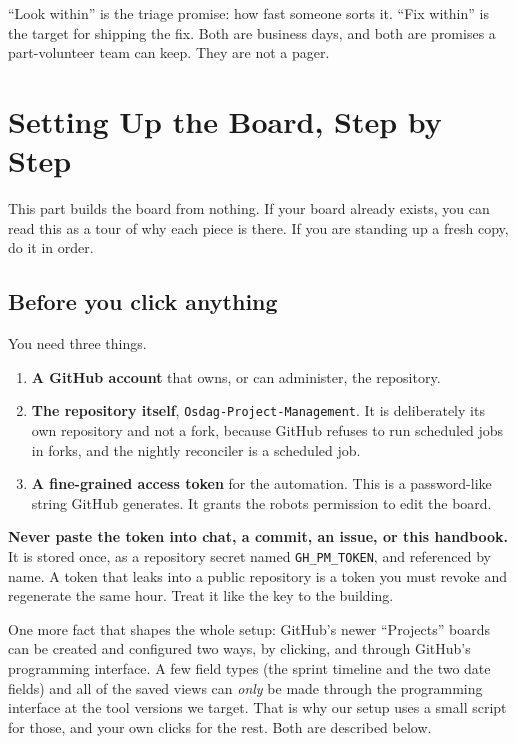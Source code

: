 \documentclass[11pt,a4paper]{report}
\newcommand{\code}[1]{\texttt{#1}}
\begin{document}
``Look within'' is the triage promise: how fast someone sorts it. ``Fix within'' is
the target for shipping the fix. Both are business days, and both are promises a
part-volunteer team can keep. They are not a pager.

\part{Setting Up the Board, Step by Step}

This part builds the board from nothing. If your board already exists, you can read
this as a tour of why each piece is there. If you are standing up a fresh copy, do
it in order.

\chapter{Before you click anything}

You need three things.

\begin{enumerate}[leftmargin=1.6em,itemsep=3pt]
  \item \textbf{A GitHub account} that owns, or can administer, the repository.
  \item \textbf{The repository itself}, \code{Osdag-Project-Management}. It is deliberately
        its own repository and not a fork, because GitHub refuses to run scheduled
        jobs in forks, and the nightly reconciler is a scheduled job.
  \item \textbf{A fine-grained access token} for the automation. This is a
        password-like string GitHub generates. It grants the robots permission to
        edit the board.
\end{enumerate}

\begin{gotcha}
\textbf{Never paste the token into chat, a commit, an issue, or this handbook.} It
is stored once, as a repository secret named \code{GH\_PM\_TOKEN}, and referenced by
name. A token that leaks into a public repository is a token you must revoke and
regenerate the same hour. Treat it like the key to the building.
\end{gotcha}

One more fact that shapes the whole setup: GitHub's newer ``Projects'' boards can be
created and configured two ways, by clicking, and through GitHub's programming
interface. A few field types (the sprint timeline and the two date fields) and all
of the saved views can \emph{only} be made through the programming interface at the
tool versions we target. That is why our setup uses a small script for those, and
your own clicks for the rest. Both are described below.
\end{document}
